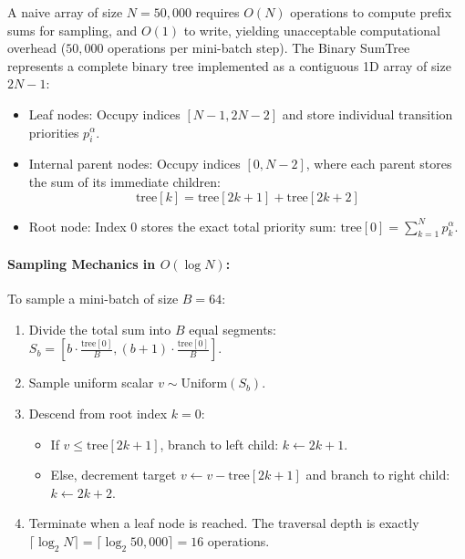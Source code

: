 \documentclass[12pt,a4paper,oneside]{report}
\begin{document}
A naive array of size $N = 50,000$ requires $O(N)$ operations to compute prefix sums for sampling, and $O(1)$ to write, yielding unacceptable computational overhead ($50,000$ operations per mini-batch step). 
The Binary SumTree represents a complete binary tree implemented as a contiguous 1D array of size $2N - 1$:
\begin{itemize}
    \item Leaf nodes: Occupy indices $[N-1, 2N-2]$ and store individual transition priorities $p_i^\alpha$.
    \item Internal parent nodes: Occupy indices $[0, N-2]$, where each parent stores the sum of its immediate children:
    \begin{equation}
    \text{tree}[k] = \text{tree}[2k + 1] + \text{tree}[2k + 2]
    \end{equation}
    \item Root node: Index $0$ stores the exact total priority sum: $\text{tree}[0] = \sum_{k=1}^N p_k^\alpha$.
\end{itemize}

\paragraph{Sampling Mechanics in $O(\log N)$:}
To sample a mini-batch of size $B = 64$:
\begin{enumerate}
    \item Divide the total sum into $B$ equal segments: $S_b = \left[ b \cdot \frac{\text{tree}[0]}{B}, (b+1) \cdot \frac{\text{tree}[0]}{B} \right]$.
    \item Sample uniform scalar $v \sim \text{Uniform}(S_b)$.
    \item Descend from root index $k = 0$:
    \begin{itemize}
        \item If $v \le \text{tree}[2k + 1]$, branch to left child: $k \leftarrow 2k + 1$.
        \item Else, decrement target $v \leftarrow v - \text{tree}[2k + 1]$ and branch to right child: $k \leftarrow 2k + 2$.
    \end{itemize}
    \item Terminate when a leaf node is reached. The traversal depth is exactly $\lceil \log_2 N \rceil = \lceil \log_2 50,000 \rceil = 16$ operations.
\end{enumerate}
\end{document}
